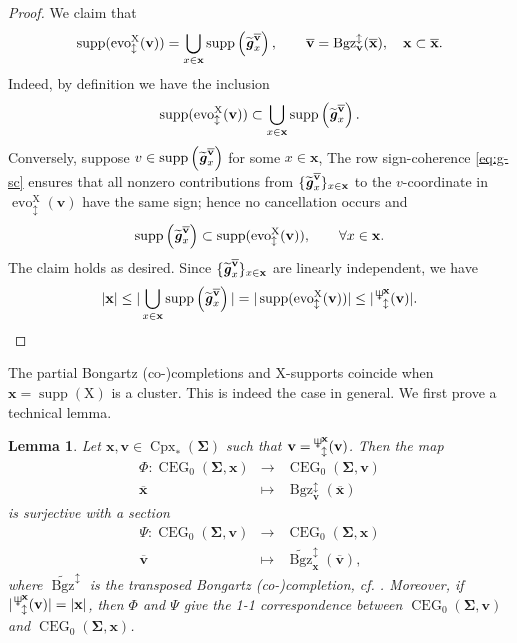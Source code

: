 \documentclass[11pt,reqno]{amsart}
\newcommand{\Neptune}{\mathord{\text{\tikz[baseline=-.5ex,scale=.13]{\draw[line width=.45pt] (0,0)--(0,1.8) (-.6,1.8)--(-.6,.8)--(.6,.8)--(.6,1.8) (-.35,.35)--(.35,.35);}}}}
\theoremstyle{plain}
\newtheorem{lemma}[theorem]{Lemma}
\theoremstyle{definition}
\numberwithin{equation}{section}
\newcommand\<{\langle}
\renewcommand\>{\rangle}
\newcommand{\CEG}{\operatorname{CEG}} %
\newcommand{\on}[1]{\operatorname{#1}}
\def\CCx{\on{Cpx}}   %
\def\vv{\mathbf{v}}
\def\uu{\mathbf{u}}
\def\sink{X}
\newcommand{\flowdu}[1]{\on{evo}_{\updownarrow}^{#1}}
\newcommand{\ccpt}[1]{\mathrm{#1}}%
\def\xevo{\ccpt{X}}%
\newcommand{\bfit}[1]{\textbf{\textit{#1}}}
\def\seeds{\mathbf{\Sigma}}
\def\xx{\mathbf{x}}%
\def\gvec{\bfit{g}}
\def\supp{\on{supp}}
\newcommand{\Bgzpm}[2]{\operatorname{Bgz}^{\updownarrow}_{#2}(#1)}
\newcommand{\tBgzpm}[2]{\widetilde{\operatorname{Bgz}}^{\updownarrow}_{#2}(#1)}
\newcommand{\suppdu}[1]{\operatorname{\Neptune}_{\updownarrow}^{#1}}
\newcommand{\ol}[1]{\overline{#1}}
\def\tgvec{\widetilde{\gvec}}
\begin{document}
\begin{proof}
We claim that
\[
\supp(\flowdu{\xevo}(\vv))
=\bigcup_{x\in\xx}\supp\left(\tgvec^{\ol\vv}_x\right),
\qquad\ol{\vv}=\Bgzpm{\ol{\xx}}{\vv},
\quad \xx\subset\ol{\xx}.
\]
Indeed, by definition we have the inclusion
\[
\supp(\flowdu{\xevo}(\vv))
\subset\bigcup_{x\in\xx}\supp\left(\tgvec^{\ol\vv}_x\right).
\]
Conversely,
suppose $v\in\supp\left(\tgvec^{\ol\vv}_x\right)$ for some $x\in\xx$,
The row sign-coherence \eqref{eq:g-sc} ensures that all nonzero contributions from $\{\tgvec^{\ol\vv}_x\}_{x\in\xx}$ to the $v$-coordinate in $\flowdu{\xevo}(\vv)$ have the same sign; hence no cancellation occurs and
\begin{gather}\label{eq:supp-g}
    \supp\left(\tgvec^{\ol\vv}_x\right)\subset\supp(\flowdu{\xevo}(\vv)),\qquad\forall x\in\xx.
\end{gather}
The claim holds as desired.
Since $\{\tgvec^{\ol\vv}_x\}_{x\in\xx}$ are linearly independent, we have
\[
|\xx|\le
|\bigcup_{x\in\xx}  \supp\left(\tgvec^{\ol\vv}_x\right)|=
|\supp(\flowdu{\xevo}(\vv))|\le
|\suppdu{\xx}(\vv)|.\qedhere
\]
\end{proof}

The partial Bongartz (co-)completions and $\xevo$-supports coincide when $\xx=\supp(\xevo)$ is a cluster.
This is indeed the case in general.
We first prove a technical lemma.

\begin{lemma}\label{lem:star-correspondence}
Let $\xx,\vv\in\CCx_*(\seeds)$ such that $\vv=\suppdu{\xx}(\vv)$.
Then the map
\[
\begin{array}{rcl}
\Phi:\CEG_0(\seeds,\xx)&\longrightarrow&\CEG_0(\seeds,\vv)\\
\ol{\xx}&\longmapsto&\Bgzpm{\ol{\xx}}{\vv}
\end{array}
\]
is surjective with a section
\[
\begin{array}{rcl}
\Psi:\CEG_0(\seeds,\vv)&\longrightarrow&\CEG_0(\seeds,\xx)\\
\ol{\vv}&\longmapsto&
\tBgzpm{\ol{\vv}}{\xx},
\end{array}
\]
where $\widetilde{\operatorname{Bgz}}^\updownarrow$ is the transposed Bongartz (co-)completion, cf. .
Moreover, if $|\suppdu{\xx}(\vv)|=|\xx|$, then $\Phi$ and $\Psi$ give the 1-1 correspondence between $\CEG_0(\seeds,\vv)$ and $\CEG_0(\seeds,\xx)$.
\end{lemma}
\end{document}
